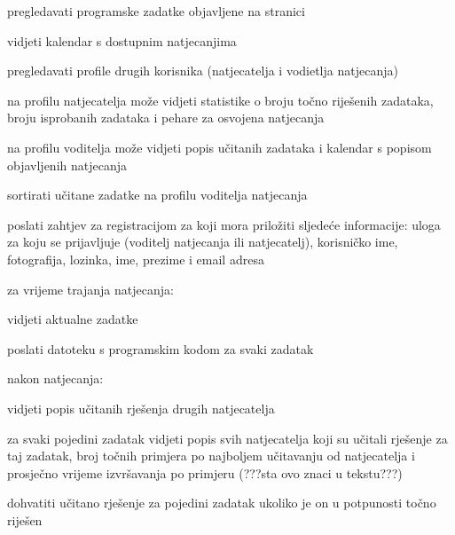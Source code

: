 \begin{packed_enum}
	\item  {}
	
	\begin{packed_enum}
		
		\item pregledavati programske zadatke objavljene na stranici
		\item vidjeti kalendar s dostupnim natjecanjima
		\item pregledavati profile drugih korisnika (natjecatelja i vodietlja natjecanja)
		\begin{packed_enum}
			
			\item  na profilu natjecatelja može vidjeti statistike o broju točno riješenih zadataka, broju isprobanih zadataka i 
			pehare za osvojena natjecanja 
			\item  na profilu voditelja može vidjeti popis učitanih zadataka i kalendar s popisom objavljenih natjecanja
			
		\end{packed_enum}
		\item sortirati učitane zadatke na profilu voditelja natjecanja
		\item poslati zahtjev za registracijom za koji mora priložiti sljedeće informacije: uloga za koju se prijavljuje (voditelj natjecanja ili natjecatelj), korisničko ime,
		fotografija, lozinka, ime, prezime i email adresa
		
	\end{packed_enum}
	
	\item \underbar{Natjecatelj (inicijator) može:}
	\begin{packed_enum}
		
		\item za vrijeme trajanja natjecanja:
		\begin{packed_enum}
			\item vidjeti aktualne zadatke
			\item poslati datoteku s programskim kodom za svaki zadatak
		\end{packed_enum}
		\item nakon natjecanja:
		\begin{packed_enum}
			\item  vidjeti popis učitanih rješenja drugih natjecatelja
			\item za svaki pojedini zadatak vidjeti popis svih natjecatelja koji su učitali rješenje za taj zadatak, broj točnih primjera po najboljem učitavanju od natjecatelja i
			prosječno vrijeme izvršavanja po primjeru (???sta ovo znaci u tekstu???)
			\item dohvatiti učitano rješenje za pojedini zadatak ukoliko je on u potpunosti točno riješen
		\end{packed_enum}
		

\end{packed_enum}
\end{packed_enum}
